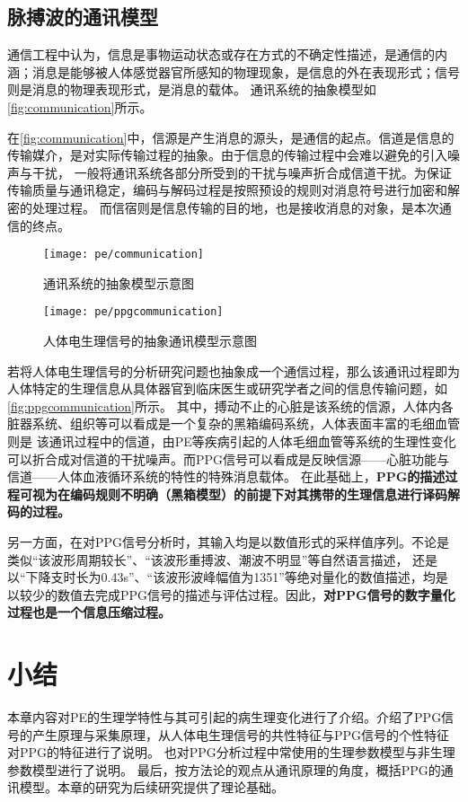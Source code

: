 \subsection{脉搏波的通讯模型}
通信工程中认为，信息是事物运动状态或存在方式的不确定性描述，是通信的内涵；消息是能够被人体感觉器官所感知的物理现象，是信息的外在表现形式；信号则是消息的物理表现形式，是消息的载体\cite{Shannon1948,Liu2019,Zhao2017}。
通讯系统的抽象模型如\autoref{fig:communication}所示。

在\autoref{fig:communication}中，信源是产生消息的源头，是通信的起点。信道是信息的传输媒介，是对实际传输过程的抽象。由于信息的传输过程中会难以避免的引入噪声与干扰，
一般将通讯系统各部分所受到的干扰与噪声折合成信道干扰。为保证传输质量与通讯稳定，编码与解码过程是按照预设的规则对消息符号进行加密和解密的处理过程。
而信宿则是信息传输的目的地，也是接收消息的对象，是本次通信的终点\cite{Zhao2017}。

\begin{figure}[htbp]
    \centering
    \texttt{[image: pe/communication]}
    \caption[通讯系统的抽象模型示意图]{\label{fig:communication}通讯系统的抽象模型示意图\cite{Zhao2017,Liu2019}}
\end{figure}

\begin{figure}[htbp]
    \centering
    \texttt{[image: pe/ppgcommunication]}
    \caption{\label{fig:ppgcommunication}人体电生理信号的抽象通讯模型示意图}
\end{figure}

若将人体电生理信号的分析研究问题也抽象成一个通信过程，那么该通讯过程即为人体特定的生理信息从具体器官到临床医生或研究学者之间的信息传输问题，如\autoref{fig:ppgcommunication}所示。
其中，搏动不止的心脏是该系统的信源，人体内各脏器系统、组织等可以看成是一个复杂的黑箱编码系统，人体表面丰富的毛细血管则是
该通讯过程中的信道，由PE等疾病引起的人体毛细血管等系统的生理性变化可以折合成对信道的干扰噪声。而PPG信号可以看成是反映信源——心脏功能与信道——人体血液循环系统的特性的特殊消息载体。
在此基础上，\textbf{PPG的描述过程可视为在编码规则不明确（黑箱模型）的前提下对其携带的生理信息进行译码解码的过程。}

另一方面，在对PPG信号分析时，其输入均是以数值形式的采样值序列。不论是类似“该波形周期较长”、“该波形重搏波、潮波不明显”等自然语言描述，
还是以“下降支时长为0.43s”、“该波形波峰幅值为1351”等绝对量化的数值描述，均是以较少的数值去完成PPG信号的描述与评估过程。因此，\textbf{对PPG信号的数字量化过程也是一个信息压缩过程。}

\section{小结}
本章内容对PE的生理学特性与其可引起的病生理变化进行了介绍。介绍了PPG信号的产生原理与采集原理，从人体电生理信号的共性特征与PPG信号的个性特征对PPG的特征进行了说明。
也对PPG分析过程中常使用的生理参数模型与非生理参数模型进行了说明。
最后，按方法论的观点从通讯原理的角度，概括PPG的通讯模型。本章的研究为后续研究提供了理论基础。